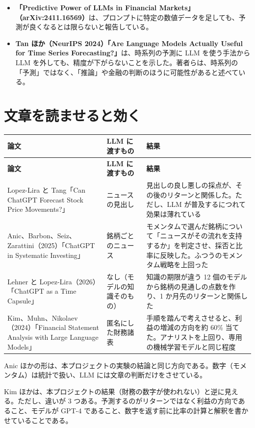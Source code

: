 \documentclass[xelatex,ja=standard,jafont=hiragino-pron,a4paper,10pt]{bxjsreport}
\begin{document}
\begin{itemize}
\item \textbf{「Predictive Power of LLMs in Financial Markets」（arXiv:2411.16569）}は、プロンプトに特定の数値データを足しても、予測が良くなるとは限らないと報告している。
\item \textbf{Tan ほか（NeurIPS 2024）「Are Language Models Actually Useful for Time Series Forecasting?」}は、時系列の予測に LLM を使う手法から LLM を外しても、精度が下がらないことを示した。著者らは、時系列の「予測」ではなく、「推論」や金融の判断のほうに可能性があると述べている。
\end{itemize}

\section{文章を読ませると効く}

\begin{longtable}{p{4.60cm}p{3.40cm}p{6.40cm}}
\toprule
\textbf{論文} & \textbf{LLM に渡すもの} & \textbf{結果} \\
\midrule
\endfirsthead
\toprule
\textbf{論文} & \textbf{LLM に渡すもの} & \textbf{結果} \\
\midrule
\endhead
\bottomrule
\endfoot
Lopez-Lira と Tang「Can ChatGPT Forecast Stock Price Movements?」 & ニュースの見出し & 見出しの良し悪しの採点が、その後のリターンと関係した。ただし、LLM が普及するにつれて効果は薄れている \\
Anic、Barbon、Seiz、Zarattini（2025）「ChatGPT in Systematic Investing」 & 銘柄ごとのニュース & モメンタムで選んだ銘柄について「ニュースがその流れを支持するか」を判定させ、採否と比率に反映した。ふつうのモメンタム戦略を上回った \\
Lehner と Lopez-Lira（2026）「ChatGPT as a Time Capsule」 & なし（モデルの知識そのもの） & 知識の期限が違う 12 個のモデルから銘柄の見通しの点数を作り、1 か月先のリターンと関係した \\
Kim、Muhn、Nikolaev（2024）「Financial Statement Analysis with Large Language Models」 & 匿名にした財務諸表 & 手順を踏んで考えさせると、利益の増減の方向を約 60\% 当てた。アナリストを上回り、専用の機械学習モデルと同じ程度 \\
\end{longtable}

Anic ほかの形は、本プロジェクトの実験の結論と同じ方向である。数字（モメンタム）は統計で扱い、LLM には文章の判断だけをさせている。

Kim ほかは、本プロジェクトの結果（財務の数字が使われない）と逆に見える。ただし、違いが 3 つある。予測するのがリターンではなく利益の方向であること、モデルが GPT-4 であること、数字を返す前に比率の計算と解釈を書かせていることである。
\end{document}

